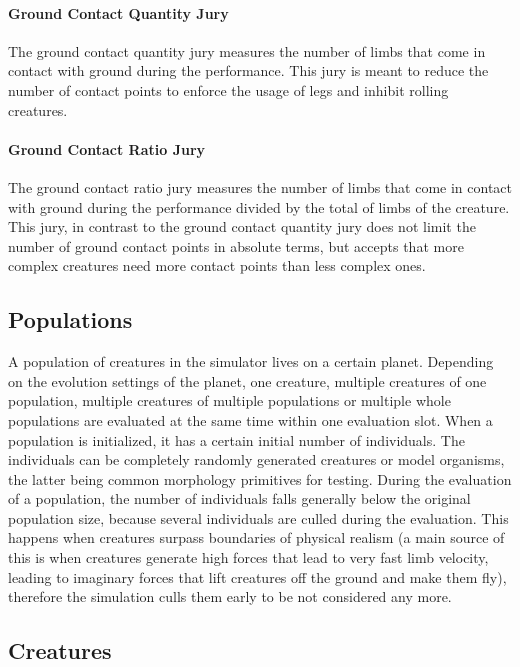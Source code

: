 \documentclass[main]{subfiles}
\begin{document}
\paragraph{Ground Contact Quantity Jury} The ground contact quantity jury measures the number of limbs that come in contact with ground during the performance. This jury is meant to reduce the number of contact points to enforce the usage of legs and inhibit rolling creatures.

\paragraph{Ground Contact Ratio Jury} The ground contact ratio jury measures the number of limbs that come in contact with ground during the performance divided by the total of limbs of the creature. This jury, in contrast to the ground contact quantity jury does not limit the number of ground contact points in absolute terms, but accepts that more complex creatures need more contact points than less complex ones.

\subsection{Populations}
\label{subsec:populations}

A population of creatures in the simulator lives on a certain planet. Depending on the evolution settings of the planet, one creature, multiple creatures of one population, multiple creatures of multiple populations or multiple whole populations are evaluated at the same time within one evaluation slot. When a population is initialized, it has a certain initial number of individuals. The individuals can be completely randomly generated creatures or model organisms, the latter being common morphology primitives for testing. During the evaluation of a population, the number of individuals falls generally below the original population size, because several individuals are culled during the evaluation. This happens when creatures surpass boundaries of physical realism (a main source of this is when creatures generate high forces that lead to very fast limb velocity, leading to imaginary forces that lift creatures off the ground and make them fly), therefore the simulation culls them early to be not considered any more.

\subsection{Creatures}
\label{subsec:creatures}
\end{document}
